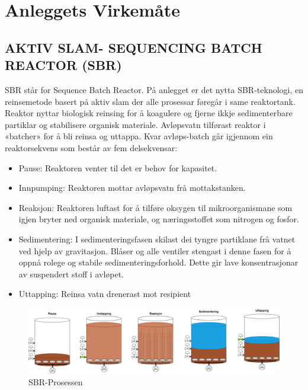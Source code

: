 \chapter{Anleggets Virkemåte}
\thispagestyle{fancy}

\section{AKTIV SLAM- SEQUENCING BATCH REACTOR (SBR)}
SBR står for Sequence Batch Reactor. På anlegget er det nytta SBR-teknologi, en reinsemetode basert på aktiv slam der alle prosessar føregår i same reaktortank. 
Reaktor nyttar biologisk reinsing for å koagulere og fjerne ikkje sedimenterbare partiklar og stabilisere organisk materiale. Avløpsvatn tilførast reaktor i «batcher» for å bli reinsa og uttappa. 
Kvar avløps-batch går igjennom ein reaktorsekvens som består av fem delsekvensar:

\begin{itemize}
    \item Pause: \newline Reaktoren venter til det er behov for kapasitet.
    \item Innpumping: \newline Reaktoren mottar avløpsvatn frå mottakstanken. 
    \item Reaksjon: \newline Reaktoren luftast for å tilføre oksygen til mikroorganismane som igjen bryter ned organisk materiale, 
    og næringsstoffet som nitrogen og fosfor.
    \item Sedimentering: \newline 
    I sedimenteringsfasen skilast dei tyngre partiklane frå vatnet ved hjelp av gravitasjon. 
    Blåser og alle ventiler stengast i denne fasen for å oppnå rolege og stabile sedimenteringsforhold. Dette gir lave konsentrasjonar av suspendert stoff i avløpet.
    \item Uttapping: \newline Reinsa vatn drenerast mot resipient
\end{itemize}

\begin{figure}[htbp]
    \centering
    \includegraphics[width=1\textwidth]{Figurar/SBR-Prosessen.png}
    \caption{SBR-Prosessen}\label{fig:SBR-prossessen}
\end{figure}
    